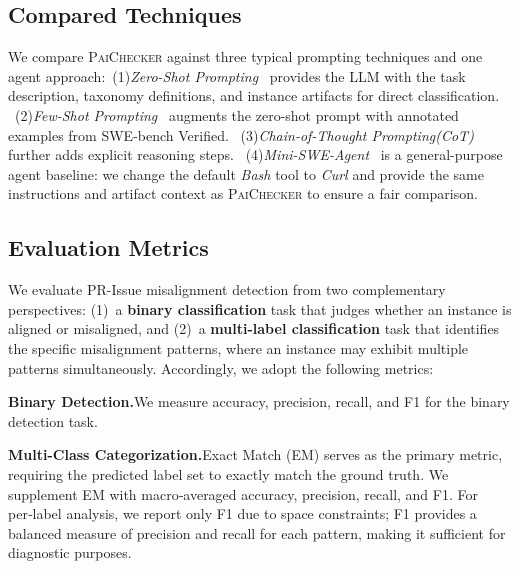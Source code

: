 \documentclass[sigconf, review, anonymous]{acmart}
\newcommand{\tool}{\textsc{PaiChecker}\xspace}
\begin{document}
    \subsection{Compared Techniques}
    \label{sec:baselines}
We compare \tool against three typical prompting techniques and one agent approach:~(1)\textit{Zero-Shot
  Prompting}~\cite{zeroshot_fewshot} provides the LLM with the task                                                               
  description, taxonomy definitions, and instance artifacts for direct                                                                     
  classification. ~(2)\textit{Few-Shot Prompting}~\cite{fewshot} augments                                                                     
  the zero-shot prompt with annotated examples from SWE-bench                                                                              
  Verified. ~(3)\textit{Chain-of-Thought Prompting(CoT)}~\cite{cot} further                                                                         
  adds explicit reasoning steps. ~(4)\textit{Mini-SWE-Agent}~\cite{minisweagent}                                                               
  is a general-purpose agent baseline: we change the default \textit{Bash} tool to\textit{ Curl }and provide the same instructions and artifact context as                                                                           
  \tool to ensure a fair comparison. 

    \subsection{Evaluation Metrics}
    \label{sec:metrics}

   We evaluate PR-Issue misalignment detection from two complementary perspectives: (1)~a \textbf{binary classification} task that judges whether an instance is aligned or misaligned, and (2)~a \textbf{multi-label classification} task that identifies the specific misalignment patterns, where an instance may exhibit multiple patterns simultaneously. Accordingly, we adopt the following metrics:


    \textbf{Binary Detection.}\quad We measure accuracy, precision, recall, and F1 for the binary detection task.

    \textbf{Multi-Class Categorization.}\quad Exact Match (EM) serves as the primary metric, requiring the predicted label set to exactly match the ground truth. We supplement EM with macro‑averaged accuracy, precision, recall, and F1. For per‑label analysis, we report only F1 due to space constraints; F1 provides a balanced measure of precision and recall for each pattern, making it sufficient for diagnostic purposes.
\end{document}
